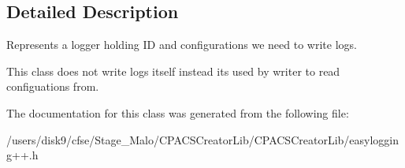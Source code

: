 \subsection{Detailed Description}
Represents a logger holding I\-D and configurations we need to write logs. 

This class does not write logs itself instead its used by writer to read configuations from. 

The documentation for this class was generated from the following file\-:\begin{DoxyCompactItemize}
\item 
/users/disk9/cfse/\-Stage\-\_\-\-Malo/\-C\-P\-A\-C\-S\-Creator\-Lib/\-C\-P\-A\-C\-S\-Creator\-Lib/easylogging++.\-h\end{DoxyCompactItemize}
